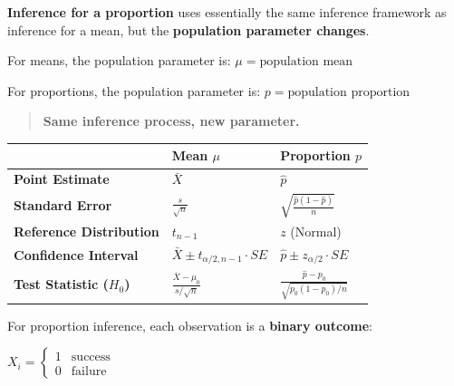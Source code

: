 \documentclass[
  letterpaper,
  DIV=11,
  numbers=noendperiod]{scrreprt}
\newcounter{none} %
\begin{document}
\textbf{Inference for a proportion} uses essentially the same inference
framework as inference for a mean, but the \textbf{population parameter
changes}.

For means, the population parameter is: \(\mu = \text{population mean}\)

For proportions, the population parameter is:
\(p = \text{population proportion}\)

\begin{quote}
\textbf{Same inference process, new parameter.}
\end{quote}

{\def\LTcaptype{none} %
\begin{longtable}[]{@{}
  >{\raggedright\arraybackslash}p{}
  >{\raggedright\arraybackslash}p{}
  >{\raggedright\arraybackslash}p{}@{}}
\toprule\noalign{}
\begin{minipage}[b]{\linewidth}\raggedright
\end{minipage} & \begin{minipage}[b]{\linewidth}\raggedright
Mean \(\mu\)
\end{minipage} & \begin{minipage}[b]{\linewidth}\raggedright
Proportion \(p\)
\end{minipage} \\
\midrule\noalign{}
\endhead
\bottomrule\noalign{}
\endlastfoot
\textbf{Point Estimate} & \(\bar{X}\) & \(\hat{p}\) \\
\textbf{Standard Error} & \(\frac{s}{\sqrt{n}}\) &
\(\sqrt{\frac{\hat{p}(1-\hat{p})}{n}}\) \\
\textbf{Reference Distribution} & \(t_{n-1}\) & \(z\) (Normal) \\
\textbf{Confidence Interval} & \(\bar{X} \pm t_{\alpha/2,n-1} \cdot SE\)
& \(\hat{p} \pm z_{\alpha/2} \cdot SE\) \\
\textbf{Test Statistic (\(H_0\))} & \(\frac{\bar{X}-\mu_0}{s/\sqrt{n}}\)
& \(\frac{\hat{p}-p_0}{\sqrt{p_0(1-p_0)/n}}\) \\
\end{longtable}
}

For proportion inference, each observation is a \textbf{binary outcome}:

\(X_i = \begin{cases}1 & \text{success} \\ 0 & \text{failure} \end{cases}\)
\end{document}
